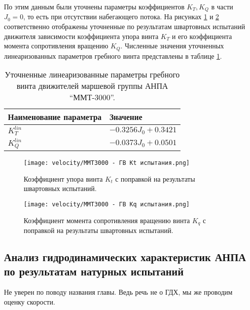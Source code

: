 По этим данным были уточнены параметры коэффициентов $K_T, K_Q$ в части $J_0 = 0$, то есть при отсутствии набегающего потока.
На рисунках \ref{fig:mmt3000_propeller_kt_bollard} и \ref{fig:mmt3000_propeller_kq_bollard} соответственно отображены уточненные по результатам швартовных испытаний движителя зависимости коэффициента упора винта $K_T$ и его коэффициента момента сопротивления вращению $K_Q$.
Численные значения уточненных линеаризованных параметров гребного винта представлены в таблице \ref{tab:mmt3000_propeller_bollard}.

\begin{table}
    \caption{Уточненные линеаризованные параметры гребного винта движителей маршевой группы АНПА ``ММТ-3000''.}
    \label{tab:mmt3000_propeller_bollard}
    \centering
    \begin{tabular}{ll}
        \toprule
        Наименование параметра  & Значение\\
        \midrule
        $K_T^{lin}$ & $-0.3256J_0 + 0.3421$ \\
        $K_Q^{lin}$ & $-0.0373J_0 + 0.0501$ \\
        \bottomrule
    \end{tabular}
\end{table}

\begin{figure}[ht]
    \centering
    \texttt{[image: velocity/MMT3000 - ГВ Kt испытания.png]}
    \caption{Коэффициент упора винта $K_t$ с поправкой на результаты швартовных испытаний.}
    \label{fig:mmt3000_propeller_kt_bollard}
\end{figure}

\begin{figure}[ht]
    \centering
    \texttt{[image: velocity/MMT3000 - ГВ Kq испытания.png]}
    \caption{Коэффициент момента сопротивления вращению винта $K_q$ с поправкой на результаты швартовных испытаний.}
    \label{fig:mmt3000_propeller_kq_bollard}
\end{figure}

\subsection{Анализ гидродинамических характеристик АНПА по результатам натурных испытаний}

\begin{notequestion}
    Не уверен по поводу названия главы. Ведь речь не о ГДХ, мы же проводим оценку скорости.
\end{notequestion}

